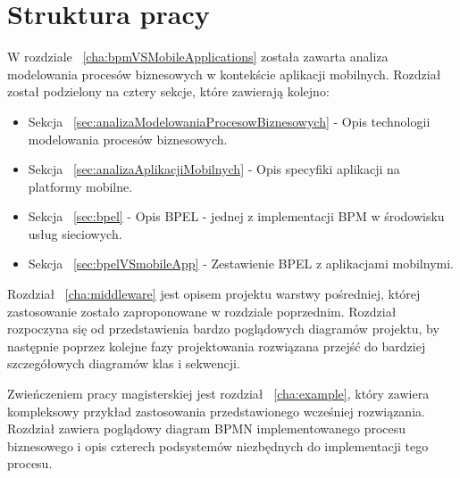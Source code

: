 \section{Struktura pracy}
\label{sec:strukturaPracy}

W rozdziale ~\ref{cha:bpmVSMobileApplications} została zawarta analiza modelowania procesów biznesowych w kontekście aplikacji mobilnych. Rozdział został podzielony na cztery sekcje, które zawierają kolejno:
\begin{itemize}
\item Sekcja ~\ref{sec:analizaModelowaniaProcesowBiznesowych} - Opis technologii modelowania procesów biznesowych.
\item Sekcja ~\ref{sec:analizaAplikacjiMobilnych} - Opis specyfiki aplikacji na platformy mobilne.
\item Sekcja ~\ref{sec:bpel} - Opis BPEL - jednej z implementacji BPM w środowisku usług sieciowych. 
\item Sekcja ~\ref{sec:bpelVSmobileApp} - Zestawienie BPEL z aplikacjami mobilnymi.
\end{itemize}

Rozdział ~\ref{cha:middleware} jest opisem projektu warstwy pośredniej, której zastosowanie zostało zaproponowane w rozdziale poprzednim. Rozdział rozpoczyna się od przedstawienia bardzo poglądowych diagramów projektu, by następnie poprzez kolejne fazy projektowania rozwiązana przejść do bardziej szczegółowych diagramów klas i sekwencji. 

Zwieńczeniem pracy magisterskiej jest rozdział ~\ref{cha:example}, który zawiera kompleksowy przykład zastosowania przedstawionego wcześniej rozwiązania. Rozdział zawiera poglądowy diagram BPMN implementowanego procesu biznesowego i opis czterech podsystemów niezbędnych do implementacji tego procesu.
